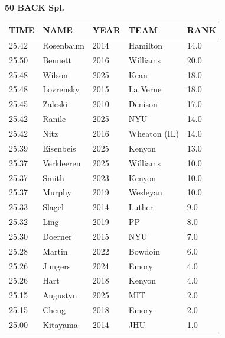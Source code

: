 \begin{table}[H]
\centering
\begin{minipage}[t]{0.6\textwidth}
\centering
\textbf{50 BACK Spl.}\\[0.1cm]
\begin{tabular}{@{}p{1.8cm}p{2.8cm}p{1.2cm}p{1.4cm}p{0.8cm}@{}}
\hline
    \textbf{TIME} & \textbf{NAME} & \textbf{YEAR} & \textbf{TEAM} & \textbf{RANK} \\
\hline
    25.42 & Rosenbaum & 2014 & Hamilton & 14.0 \\
    25.50 & Bennett & 2016 & Williams & 20.0 \\
    25.48 & Wilson & 2025 & Kean & 18.0 \\
    25.48 & Lovrensky & 2015 & La Verne & 18.0 \\
    25.45 & Zaleski & 2010 & Denison & 17.0 \\
    25.42 & Ranile & 2025 & NYU & 14.0 \\
    25.42 & Nitz & 2016 & Wheaton (IL) & 14.0 \\
    25.39 & Eisenbeis & 2025 & Kenyon & 13.0 \\
    25.37 & Verkleeren & 2025 & Williams & 10.0 \\
    25.37 & Smith & 2023 & Kenyon & 10.0 \\
    25.37 & Murphy & 2019 & Wesleyan & 10.0 \\
    25.33 & Slagel & 2014 & Luther & 9.0 \\
    25.32 & Ling & 2019 & PP & 8.0 \\
    25.30 & Doerner & 2015 & NYU & 7.0 \\
    25.28 & Martin & 2022 & Bowdoin & 6.0 \\
    25.26 & Jungers & 2024 & Emory & 4.0 \\
    25.26 & Hart & 2018 & Kenyon & 4.0 \\
    25.15 & Augustyn & 2025 & MIT & 2.0 \\
    25.15 & Cheng & 2018 & Emory & 2.0 \\
    25.00 & Kitayama & 2014 & JHU & 1.0 \\
\hline
\end{tabular}
\end{minipage}
\end{table}

